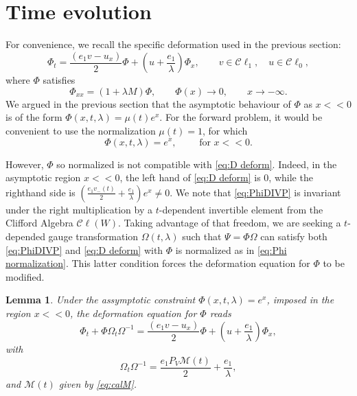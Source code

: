 \documentclass[10pt,a4paper]{article}
\numberwithin{equation}{section}
\theoremstyle{plain}
\newtheorem{lemma}[lemma]{Lemma}
\theoremstyle{definition}
\newcommand\Cl{\mathcal{C}\ell}
\renewcommand{\l}{\lambda}
\begin{document}
\section{Time evolution} 

For convenience, we recall the specific deformation used in the previous section: 
\begin{equation}\label{eq:D deform}
\Phi_t=\frac{(e_1 v-u_x)}{2} \Phi+ (u+\frac{e_1}{\lambda}) \Phi_x, \qquad v\in \Cl_1, \quad u\in \Cl_0,  
\end{equation} 
 where $\Phi$ satisfies 
\begin{equation} \label{eq:PhiDIVP}
 \Phi_{xx}=(1+\lambda M )\Phi, \qquad \Phi(x) \rightarrow 0, \qquad x\rightarrow -\infty. 
\end{equation}
 We argued in the previous section that the asymptotic behaviour of $\Phi$ as $x<<0$ is of the 
 form $\Phi(x,t,\l)=\mu(t) e^x$.  
 For the forward problem, it would be convenient to use the normalization $\mu(t)=1$, for which 
 \begin{equation} \label{eq:Phi normalization} 
 \Phi(x,t,\lambda)=e^x, \qquad \text{ for   } x<<0. 
 \end{equation}   
 

However, $\Phi$ so normalized is not compatible with \eqref{eq:D deform}.  Indeed, 
in the asymptotic region $x<< 0$, the left hand of \eqref{eq:D deform} is $0$, while the righthand side is 
$(\frac{e_1 v_{-}(t)}{2} +\frac{e_1}{\l})e^x\neq 0$.  We note that \autoref{eq:PhiDIVP} is invariant under the right multiplication by a $t$-dependent invertible element from the Clifford Algebra $\Cl(W)$.   Taking advantage of that freedom, we are seeking a 
$t$-depended gauge transformation $\Omega(t, \l)$ such that $\Psi=\Phi \Omega$ can satisfy 
both \eqref{eq:PhiDIVP} and \eqref{eq:D  deform} with $\Phi$ is normalized as in \autoref{eq:Phi normalization}. 
This latter condition forces the deformation equation for $\Phi$ to be modified.  
\begin{lemma} Under the assymptotic constraint 
$\Phi(x,t,\l)=e^x$, imposed in the region $x<<0$, the deformation equation for $\Phi$ reads 
\begin{equation} \label{eq:t-DOmega} 
\Phi_t+\Phi \Omega_t \Omega^{-1} =\frac{(e_1 v-u_x)}{2} \Phi+ (u+\frac{e_1}{\lambda}) \Phi_x, 
\end{equation} 
with 
\begin{equation} \label{eq:Domegadef}
 \Omega_t \Omega^{-1} = \frac{e_1P_V \mathcal{M}(t)}{2} +\frac{e_1}{\l},    
\end{equation} 
and $\mathcal{M}(t)$ given by \autoref{eq:calM}.  
\end{lemma} 
\end{document}
